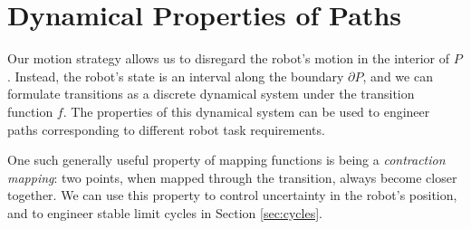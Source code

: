 \documentclass[]{styles/svproc}  %
\begin{document}
%
%



\section{Dynamical Properties of Paths}


Our motion strategy allows us to disregard the robot's motion in the interior of
$P$. Instead, the robot's state is an interval 
along the boundary $\partial P$, and we can formulate transitions as a discrete
dynamical system under the transition function $f$. The properties of this
dynamical system can be used to engineer paths corresponding to different robot
task requirements.

One such generally useful property of mapping functions is being a \emph{contraction mapping}: 
two points, when mapped through the
transition, always become closer together. We can use this property to control
uncertainty in the robot's position, and to engineer stable limit cycles in
Section \ref{sec:cycles}.
\end{document}
